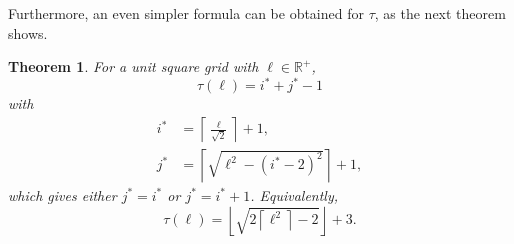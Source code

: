 \documentclass[12pt, a4paper]{article}
\newcommand{\funt}{\tau} %
\newcommand{\len}{\ell} %
\newcommand{\isoli}{i^\ast}
\newcommand{\jsoli}{j^\ast}
\newtheorem{theorem}{Theorem}%
\begin{document}
Furthermore, an even simpler formula can be obtained for $\funt$, as the next theorem shows.

\begin{theorem}
\label{theo: funt, sq, form}
For a unit square grid with $\len \in \mathbb R^+$,
\begin{equation}
\label{eq: theo: funt, sq, form; funt, with i, j}
\funt(\len) = \isoli+\jsoli-1
\end{equation}
with
\begin{align}
\label{eq: theo: funt, sq, form; i}
\isoli &= \left\lceil \frac{\len}{\sqrt{2}} \right\rceil + 1, \\
\label{eq: theo: funt, sq, form; j}
\jsoli &= \left\lceil \sqrt{\len^2-(\isoli-2)^2} \right\rceil + 1,
\end{align}
which gives either $\jsoli = \isoli$ or $\jsoli = \isoli+1$. Equivalently,
\begin{equation}
\label{eq: theo: funt, sq, form; funt, simpler}
\funt(\len) = \left\lfloor \sqrt{2 \left\lceil \len^2 \right\rceil - 2} \right\rfloor + 3.
\end{equation}
\end{theorem}
\end{document}
